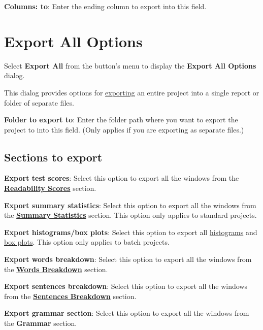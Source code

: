 \documentclass[
]{book}
\theoremstyle{definition}
\theoremstyle{definition}
\theoremstyle{definition}
\theoremstyle{definition}
\theoremstyle{remark}
\begin{document}
\textbf{Columns: to}: Enter the ending column to export into this field.

\hypertarget{export-all-options}{%
\section{Export All Options}\label{export-all-options}}

Select \textbf{Export All} from the  button's menu to display the \textbf{Export All Options} dialog.

This dialog provides options for \protect\hyperlink{exporting}{exporting} an entire project into a single report or folder of separate files.

\textbf{Folder to export to}: Enter the folder path where you want to export the project to into this field. (Only applies if you are exporting as separate files.)

\hypertarget{sections-to-export}{%
\subsection*{Sections to export}\label{sections-to-export}}

\textbf{Export test scores}: Select this option to export all the windows from the \protect\hyperlink{reviewing-test-scores}{\textbf{Readability Scores}} section.

\textbf{Export summary statistics}: Select this option to export all the windows from the \protect\hyperlink{reviewing-statistics}{\textbf{Summary Statistics}} section. This option only applies to standard projects.

\textbf{Export histograms/box plots}: Select this option to export all \protect\hyperlink{reviewing-batch-histograms}{histograms} and \protect\hyperlink{reviewing-batch-box-plots}{box plots}. This option only applies to batch projects.

\textbf{Export words breakdown}: Select this option to export all the windows from the \protect\hyperlink{reviewing-word-breakdowns}{\textbf{Words Breakdown}} section.

\textbf{Export sentences breakdown}: Select this option to export all the windows from the \protect\hyperlink{reviewing-sentences-breakdown}{\textbf{Sentences Breakdown}} section.

\textbf{Export grammar section}: Select this option to export all the windows from the \textbf{Grammar} section.
\end{document}
